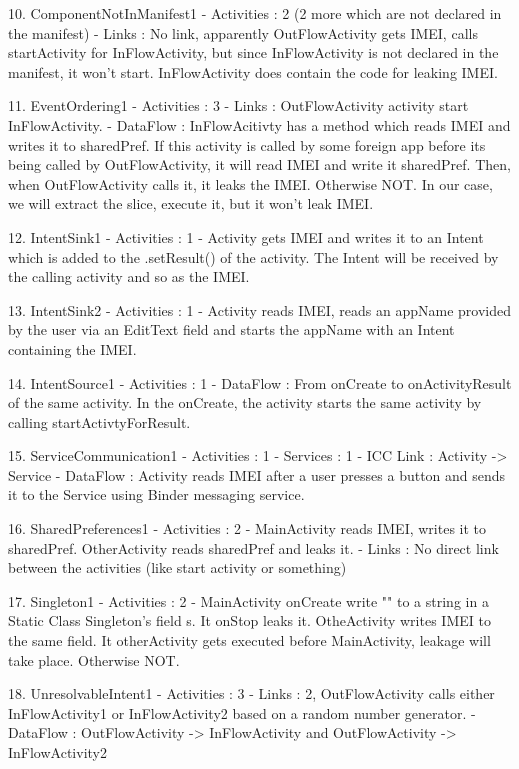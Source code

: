 10. ComponentNotInManifest1
 - Activities : 2 (2 more which are not declared in the manifest)
 - Links : No link, apparently OutFlowActivity gets IMEI, calls startActivity for InFlowActivity, but since InFlowActivity is not declared in the manifest, it won't start. InFlowActivity does contain the code for leaking IMEI.
 
11. EventOrdering1
 - Activities : 3
 - Links : OutFlowActivity activity start InFlowActivity. 
 - DataFlow : InFlowAcitivty has a method which reads IMEI and writes it to sharedPref. If this activity is called by some foreign app before its being called by OutFlowActivity, it will read IMEI and write it sharedPref. Then, when OutFlowActivity calls it, it leaks the IMEI. Otherwise NOT. In our case, we will extract the slice, execute it, but it won't leak IMEI.
 
12. IntentSink1
 - Activities : 1
 - Activity gets IMEI and writes it to an Intent which is added to the .setResult() of the activity. The Intent will be received by the calling activity and so as the IMEI. 
 
13. IntentSink2
 - Activities : 1
 - Activity reads IMEI, reads an appName provided by the user via an EditText field and starts the appName with an Intent containing the IMEI.
 
14. IntentSource1
 - Activities : 1
 - DataFlow : From onCreate to onActivityResult of the same activity. In the onCreate, the activity starts the same activity by calling startActivtyForResult. 
 
15. ServiceCommunication1
 - Activities : 1
 - Services : 1
 - ICC Link : Activity -> Service
 - DataFlow : Activity reads IMEI after a user presses a button and sends it to the Service using Binder messaging service.
 
16. SharedPreferences1
 - Activities : 2
 - MainActivity reads IMEI, writes it to sharedPref. OtherActivity reads sharedPref and leaks it. 
 - Links : No direct link between the activities (like start activity or something)
 
17. Singleton1
 - Activities : 2
 - MainActivity onCreate write "" to a string in a Static Class Singleton's field s. It onStop leaks it. OtheActivity writes IMEI to the same field. It otherActivity gets executed before MainActivity, leakage will take place. Otherwise NOT.
 
18. UnresolvableIntent1
 - Activities : 3
 - Links : 2, OutFlowActivity calls either InFlowActivity1 or InFlowActivity2 based on a random number generator. 
 - DataFlow : OutFlowActivity -> InFlowActivity and OutFlowActivity -> InFlowActivity2
\fi


